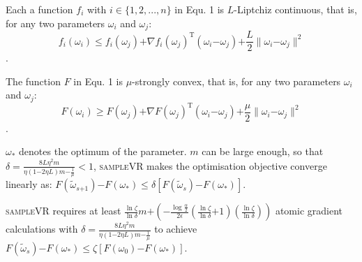 \documentclass[letterpaper]{article}
\begin{document}
\begin{Assumption}
Each a function $f_i$ with $i\in\{1,2, ..., n\}$ in Equ. 1 is $L$-Liptchiz continuous, that is, for any two parameters $\omega_i$ and $\omega_j$:
\label{assumption_liptchiz}
\begin{equation}
\label{equa_l_smooth} 
f_i(\omega_i)\le f_i(\omega_j)\mathrm{+}\nabla f_i(\omega_j)^\mathrm{T} (\omega_i\mathrm{-}\omega_j)\mathrm{+}\frac{L}{2}\parallel \omega_i\mathrm{-}\omega_j\parallel^2
 \end{equation}.

\end{Assumption}

\begin{Assumption}
\label{assumption_strongly_convex}
The function $F$ in Equ. 1 is $\mu$-strongly convex, that is, for any two parameters $\omega_i$ and $\omega_j$:
\begin{equation}
\label{equa_gamma_convex} 
F(\omega_i)\ge F(\omega_j)\mathrm{+}\nabla F(\omega_j)^\mathrm{T} (\omega_i\mathrm{-}\omega_j)\mathrm{+}\frac{\mu}{2}\parallel \omega_i\mathrm{-}\omega_j\parallel^2
\end{equation}.

\end{Assumption}

\begin{Theorem}
\label{theorem_converge}
$\omega_\ast$ denotes the optimum of the parameter.  $m$ can be large enough, so that $\delta = \frac{8 L \eta^2 m}{ \eta(1\mathrm{-}2\eta L) m  \mathrm{-}  \frac{1}{\mu}    }     <1$, \textsc{sampleVR} makes the optimisation objective converge linearly as:
$F(\tilde{\omega}_{s\mathrm{+}1}) \mathrm{-} F(\omega_\ast)  \le \delta [F(\tilde{\omega}_s)\mathrm{-}F(\omega_\ast)]$.
\end{Theorem}


\begin{Theorem}
\label{theorem_gradient_complexity}
\textsc{sampleVR} requires at least  $\frac{\ln \zeta}{\ln \delta}m\mathrm{+}\left( \mathrm{-} \frac{\log\frac{\alpha}{2}}{2\epsilon} (\frac{\ln \zeta}{\ln \delta}\mathrm{+}1)(\frac{\ln \zeta}{\ln \delta})\right)$ atomic gradient calculations with $\delta \mathrm{=} \frac{8 L \eta^2 m}{ \eta(1\mathrm{-}2\eta L) m  \mathrm{-}  \frac{1}{\mu}    }$ to achieve $F(\tilde{\omega}_s)\mathrm{-}F(\omega_\ast) \mathrm{\le} \zeta [F(\omega_0)\mathrm{-}F(\omega_\ast)]$.
\end{Theorem}
\end{document}
